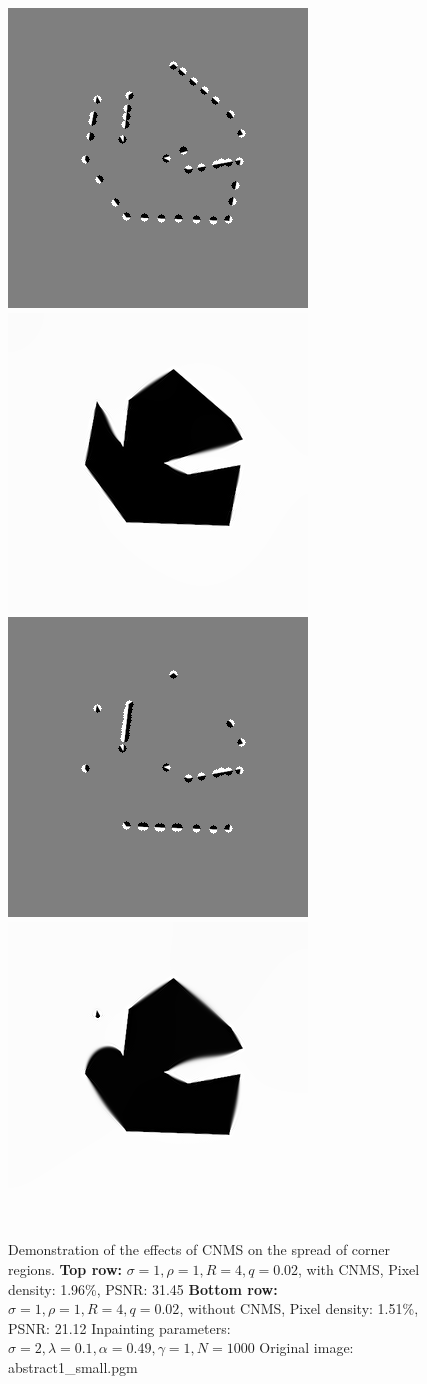 \begin{figure}[h]
    \centering
    \includegraphics[width=0.4\linewidth]{../Images/abstract/abstract1_small-mask.png}\hspace{0.2cm}
    \includegraphics[width=0.4\linewidth]{../Images/abstract/abstract1_small-inpaint.png}\\
    \vspace*{0.2cm}
    \includegraphics[width=0.4\linewidth]{../Images/abstract/abstract1_small-mask_no_cnms.png}\hspace{0.2cm}
    \includegraphics[width=0.4\linewidth]{../Images/abstract/abstract1_small-inpaint_no_cnms.png}\\
    \caption{Demonstration of the effects of CNMS on the spread of corner regions.
\textbf{Top row:} $\sigma=1,\rho=1,R=4,q=0.02$, with CNMS, Pixel density: 1.96\%, PSNR:
31.45
\textbf{Bottom row:} $\sigma=1,\rho=1,R=4,q=0.02$, without CNMS, Pixel density:
1.51\%, PSNR: 21.12
Inpainting parameters: $\sigma=2,\lambda=0.1,\alpha=0.49,\gamma=1,N=1000$
Original image: abstract1\_small.pgm }
\label{fig:AbstractCNMSExamples}
\end{figure}
